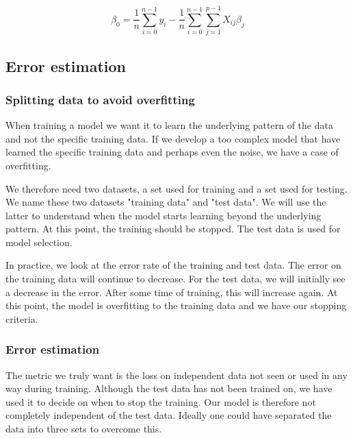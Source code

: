 \begin{equation}\label{bet0}
    \beta_0 = \frac{1}{n}\sum_{i=0}^{n-1}y_i - \frac{1}{n}\sum_{i=0}^{n-1}\sum_{j=1}^{p-1}X_{ij}\beta_j
\end{equation}

\subsection{Error estimation}

\subsubsection{Splitting data to avoid overfitting}\label{overfitting}

When training a model we want it to learn the underlying pattern of the data and not the specific training data. If we develop a too complex model that have learned the specific training data and perhaps even the noise, we have a case of overfitting. 

We therefore need two datasets, a set used for training and a set used for testing. We name these two datasets "training data" and "test data". 
We will use the latter to understand when the model starts learning beyond the underlying pattern. At this point, the training should be stopped. The test data is used for model selection. 

In practice, we look at the error rate of the training and test data. The error on the training data will continue to decrease. For the test data, we will initially see a decrease in the error. After some time of training, this will increase again. At this point, the model is overfitting to the training data and we have our stopping criteria.


\subsubsection{Error estimation}

The metric we truly want is the loss on independent data not seen or used in any way during training. Although the test data has not been trained on, we have used it to decide on when to stop the training. Our model is therefore not completely independent of the test data. Ideally one could have separated the data into three sets to overcome this. 

